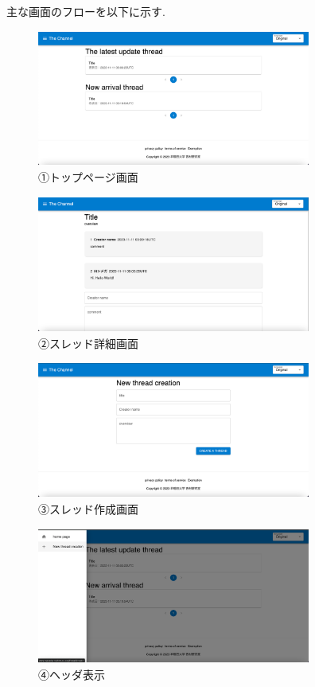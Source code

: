 \documentclass[b5paper,12pt]{jsreport}
\begin{document}
主な画面のフローを以下に示す.

\begin{figure}[htbp]
	\centering
	\includegraphics[width=90mm,height=45mm]{img/home.png}

	\caption*{①トップページ画面}
\end{figure}
\begin{figure}[htbp]
	\centering
	\includegraphics[width=90mm,height=45mm]{img/thread.png}

	\caption*{②スレッド詳細画面}
\end{figure}

\begin{figure}[htbp]
	\centering
	\includegraphics[width=90mm,height=45mm]{img/thread_create.png}

	\caption*{③スレッド作成画面}
\end{figure}

\begin{figure}[htbp]
	\centering
	\includegraphics[width=90mm,height=45mm]{img/side_menu.png}

	\caption*{④ヘッダ表示}
\end{figure}
\end{document}
